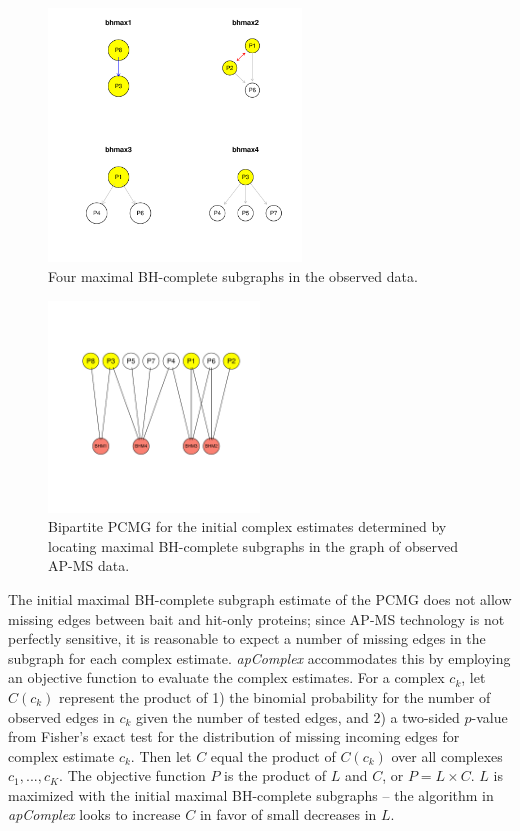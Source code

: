 \documentclass[11pt]{article}
\newcommand{\Rpackage}[1]{{\textit{#1}}}
\begin{document}
\begin{figure}[htbp]
\begin{center}
\includegraphics[width=0.6\textwidth]{apComplex-PCMG0graph}
\caption{\label{fig:PCMG0} Four maximal BH-complete subgraphs in the observed
data.}
\end{center}
\end{figure}


\begin{figure}[htbp]
\begin{center}
\includegraphics[width=0.5\textwidth]{apComplex-BP1}
\caption{\label{fig:BP1} Bipartite PCMG for the initial complex estimates
determined by locating maximal BH-complete subgraphs in the graph of observed AP-MS data.}
\end{center}
\end{figure}

The initial maximal BH-complete subgraph estimate of the PCMG does not allow missing
edges between bait and hit-only proteins; since AP-MS technology
is not perfectly sensitive, it is reasonable to expect a number of missing
edges in the subgraph for each complex estimate.  \Rpackage{apComplex}
accommodates this by employing an objective function to evaluate the complex
estimates.  For a complex $c_k$, let $C(c_k)$
represent the product of 1) the binomial
probability for the number of observed edges in $c_k$ given the number
of tested edges, and 2) a two-sided $p$-value from Fisher's exact test for the
distribution of missing incoming edges for complex estimate $c_k$.  Then let
$C$ equal the product of $C(c_k)$ over all complexes $c_1,...,c_K$.  The objective function
$P$ is the product of $L$ and $C$, or $P=L \times C$.  $L$ is maximized with
the initial maximal BH-complete subgraphs -- the algorithm in
\Rpackage{apComplex} looks to increase $C$ in favor of small decreases in $L$.
\end{document}
